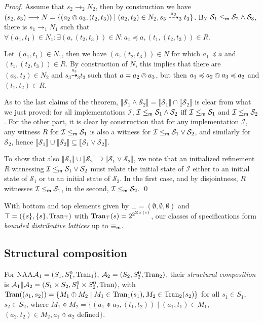 \documentclass[twocolumn]{svjour3-dummy}
\newcommand*\labpre{\preccurlyeq}
\newcommand*\oland{\owedge}
\newcommand*\cI{\mathcal I}
\newcommand*{\must}[1]{\overset{#1}{\longrightarrow}}
\newcommand*{\may}[1]{\overset{#1}{\dashrightarrow}}
\newcommand*\NAA{NAA\xspace}
\newcommand*\mr{\le_\textup{\textsf{m}}}
\newcommand*\mreq{\equiv_\textup{\textsf{m}}}
\newcommand*\cA{\mathcal A}
\newcommand*\Tran{\textup{\textrm{Tran}}}
\newcommand*\sem[1]{\llbracket #1\rrbracket}
\newcommand*\cS{\mathcal S}
\begin{document}
\begin{proof}
  Assume that $s_2\must{}_2 N_2$, then by construction we have $( s_2,
  s_3)\must{} N=\{( a_2\oland a_3,( t_2, t_3))\mid( a_2, t_2)\in N_2,
  s_3\may{ a_3}_3 t_3\}$.  By $\cS_1\mr \cS_2\land \cS_3$, there is
  $s_1\must{}_1 N_1$ such that $\forall( a_1, t_1)\in N_1: \exists( a,(
  t_2, t_3))\in N: a_1\labpre a,( t_1,( t_2, t_3))\in R$.

  Let $( a_1, t_1)\in N_1$, then we have $( a,( t_2, t_3))\in N$ for
  which $a_1\labpre a$ and $( t_1,( t_2, t_3))\in R$.  By construction
  of $N$, this implies that there are $( a_2, t_2)\in N_2$ and $s_3\may{
    a_3}_3 t_3$ such that $a= a_2\oland a_3$, but then $a_1\labpre
  a_2\oland a_3\labpre a_2$ and $( t_1, t_2)\in R$.

  As to the last claims of the theorem, $\sem{ \cS_1\land \cS_2}= \sem{
    \cS_1}\cap \sem{ \cS_2}$ is clear from what we just proved: for all
  implementations $\cI$, $\cI\mr \cS_1\land \cS_2$ iff $\cI\mr \cS_1$
  and $\cI\mr \cS_2$.  For the other part, it is clear by construction
  that for any implementation $\cI$, any witness $R$ for $\cI\mr \cS_1$
  is also a witness for $\cI\mr \cS_1\lor \cS_2$, and similarly for
  $\cS_2$, hence $\sem{ \cS_1}\cup \sem{ \cS_2}\subseteq \sem{ \cS_1\lor
    \cS_2}$.

  To show that also $\sem{ \cS_1}\cup \sem{ \cS_2}\supseteq \sem{
    \cS_1\lor \cS_2}$, we note that an initialized refinement $R$
  witnessing $\cI\mr \cS_1\lor \cS_2$ must relate the initial state of
  $\cI$ either to an initial state of $\cS_1$ or to an initial state of
  $\cS_2$.  In the first case, and by disjointness, $R$ witnesses
  $\cI\mr \cS_1$, in the second, $\cI\mr \cS_2$.  \qed
\end{proof}

With bottom and top elements given by $\bot=( \emptyset, \emptyset,
\emptyset)$ and $\top=(\{ s\},\{ s\}, \Tran_\top)$ with $\Tran_\top( s)=
2^{ 2^{ \Sigma\times\{ s\}}}$, our classes of specifications form
\emph{bounded distributive lattices} up to $\mreq$.

\subsection{Structural composition}
\label{se:comp}

For \NAA $\cA_1=( S_1, S_1^0, \Tran_1)$, $\cA_2=( S_2, S_2^0, \Tran_2)$,
their \emph{structural composition} is $\cA_1\| \cA_2=( S_1\times S_2,
S_1^0\times S_2^0, \Tran)$, with $\Tran(( s_1, s_2))=\{ M_1\obar M_2\mid
M_1\in \Tran_1( s_1), M_2\in \Tran_2( s_2)\}$ for all $s_1\in S_1$,
$s_2\in S_2$, where $M_1\obar M_2=\{( a_1\obar a_2,( t_1, t_2))\mid(
a_1, t_1)\in M_1,$ $( a_2, t_2)\in M_2, a_1\obar a_2\text{ defined}\}$.
\end{document}
